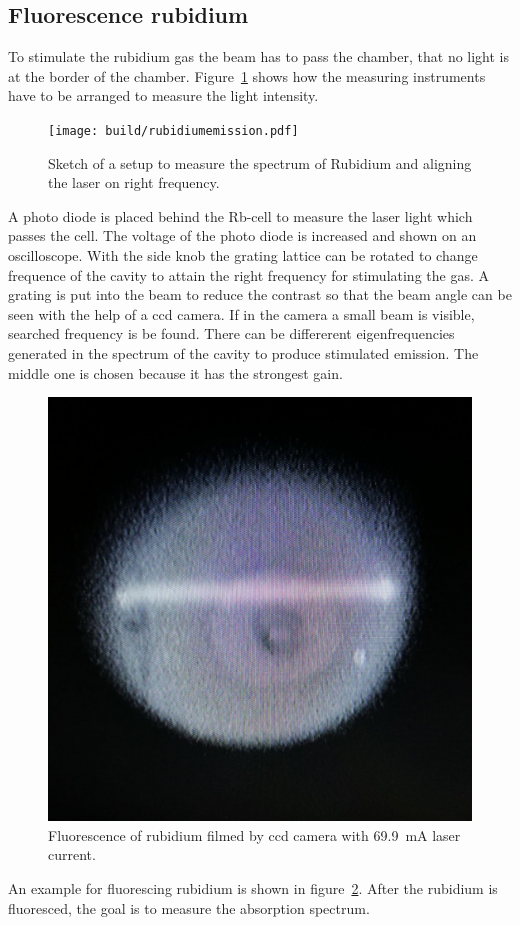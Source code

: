 \subsection{Fluorescence rubidium}%
\label{sub:anregen_rubidium}

To stimulate the rubidium gas the beam has to pass the chamber, that no
light is at the border of the chamber. 
Figure~\ref{fig:hole_emission} shows how the measuring instruments have to be
arranged to measure the light intensity.
\begin{figure}[h]
		\centering
		\texttt{[image: build/rubidiumemission.pdf]}
		\caption{Sketch of a setup to measure the spectrum of Rubidium and
		aligning the laser on right frequency.\cite{anleitung}}%
		\label{fig:hole_emission}
\end{figure}
A photo diode is placed behind the Rb-cell to measure the laser light which
passes the cell.
The voltage of the photo diode is increased and shown on an oscilloscope. 
With the side knob the grating lattice can be rotated to change frequence of the
cavity to attain the right frequency for stimulating the gas.
A grating is put into the beam to reduce the contrast so that the beam angle
can be seen with the help of a ccd camera. 
If in the camera a small beam is visible, searched frequency is be found. 
There can be differerent eigenfrequencies generated in the spectrum of the
cavity to produce stimulated emission.
The middle one is chosen because it has the strongest gain.
\begin{figure}[h]
		\centering
		\includegraphics[width=0.4\linewidth]{./content/pictures/fluorescence.jpg}
		\caption{Fluorescence of rubidium filmed by ccd camera with 
				\SI{69.9}{\milli\ampere} laser current.}%
		\label{fig:ionized}
\end{figure}
An example for fluorescing rubidium is shown in figure~\ref{fig:ionized}.
After the rubidium is fluoresced, the goal is to measure the absorption spectrum. 

